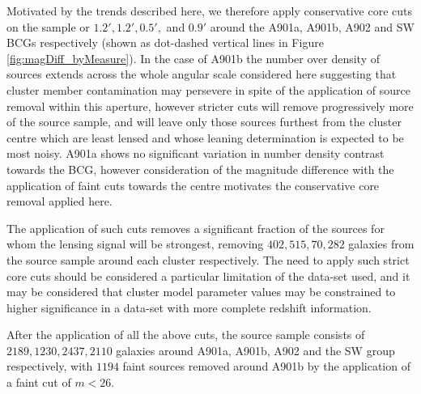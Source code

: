\documentclass[useAMS,usenatbib,times,letter,amssymb]{mn2e}
\begin{document}
Motivated by the trends described here, we therefore apply conservative core cuts on the sample or $1.2', 1.2', 0.5',$ and $0.9'$ around the A901a, A901b, A902 and SW BCGs respectively (shown as dot-dashed vertical lines in Figure \ref{fig:magDiff_byMeasure}). In the case of A901b the number over density of sources extends across the whole angular scale considered here suggesting that cluster member contamination may persevere in spite of the application of source removal within this aperture, however stricter cuts will remove progressively more of the source sample, and will leave only those sources furthest from the cluster centre which are least lensed and whose leaning determination is expected to be most noisy. A901a shows no significant variation in number density contrast towards the BCG, however consideration of the magnitude difference with the application of faint cuts towards the centre motivates the conservative core removal  applied here.

The application of such cuts removes a significant fraction of the sources for whom the lensing signal will be strongest, removing $402, 515, 70, 282$ galaxies from the source sample around each cluster respectively. The need to apply such strict core cuts should be considered a particular limitation of the data-set used, and it may be considered that cluster model parameter values may be constrained to higher significance in a data-set with more complete redshift information.

After the application of all the above cuts, the source sample consists of $2189, 1230, 2437, 2110$ galaxies around A901a, A901b, A902 and the SW group respectively, with $1194$ faint sources removed around A901b by the application of a faint cut of $m<26$.
\end{document}
